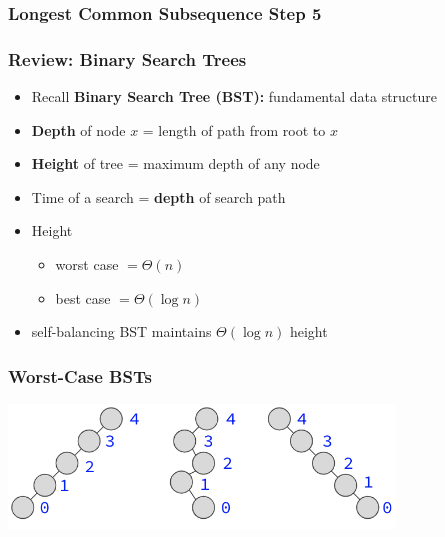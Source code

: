 \documentclass[10pt,aspectratio=169]{beamer}
\begin{document}
\begin{frame} \frametitle{Longest Common Subsequence Step 5}
  {\small
  \begin{algorithmic}[1]
      \State \Return{$\langle \rangle$} 
    \EndIf
      \State {} 
      \State {}
    \Else
      \State {}
    \EndIf
    \EndFunction
  \end{algorithmic}
  }
\end{frame}

\begin{frame} \frametitle{Review: Binary Search Trees}
\begin{itemize}
  \item Recall \textbf{Binary Search Tree (BST):} fundamental data structure
  \item \textbf{Depth} of node $x$ = length of path from root to $x$
  \item \textbf{Height} of tree = maximum depth of any node
  \item Time of a search = \textbf{depth} of search path
  \item Height
    \begin{itemize}
      \item worst case $= \Theta(n)$
      \item best case $= \Theta(\log n)$
    \end{itemize}
  \item self-balancing BST maintains $\Theta(\log n)$ height
  \end{itemize}
\end{frame}

\begin{frame} \frametitle{Worst-Case BSTs}
  \begin{center}
    \includegraphics[height=1.3in]{bst_worst_case.png}
  \end{center}
\end{frame}
\end{document}

